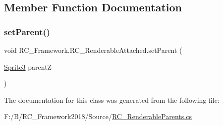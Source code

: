 \subsection{Member Function Documentation}
\mbox{\label{class_r_c___framework_1_1_r_c___renderable_attached_aa8a7fd45e198635a8ee01c16877cfe8f}} 
\subsubsection{\texorpdfstring{set\+Parent()}{setParent()}}
{\footnotesize\ttfamily void R\+C\+\_\+\+Framework.\+R\+C\+\_\+\+Renderable\+Attached.\+set\+Parent (\begin{DoxyParamCaption}\item[{\mbox{\hyperlink{class_r_c___framework_1_1_sprite3}{Sprite3}}}]{parentZ }\end{DoxyParamCaption})}



The documentation for this class was generated from the following file\+:\begin{DoxyCompactItemize}
\item 
F\+:/\+B/\+R\+C\+\_\+\+Framework2018/\+Source/\mbox{\hyperlink{_r_c___renderable_parents_8cs}{R\+C\+\_\+\+Renderable\+Parents.\+cs}}\end{DoxyCompactItemize}
